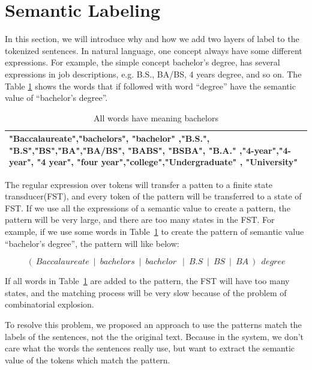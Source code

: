 \section{Semantic Labeling}

In this section, we will introduce why and how we add two layers of label to the tokenized sentences. In natural language, one concept always have some different expressions. For example, the simple concept bachelor's degree,  has several expressions in job descriptions, e.g. B.S., BA/BS, 4 years degree, and so on. The Table \ref{tab:multispelling} shows the words that if followed with word ``degree'' have the semantic value of ``bachelor's degree''.

\begin{table}[ht]
\caption{All words have meaning bachelors } %
\centering %
\begin{tabular}{  | p{15cm} |  }
 \hline
 "Baccalaureate","bachelors", "bachelor" ,"B.S.", "B.S","BS","BA","BA/BS", "BABS", "BSBA", "B.A." ,"4-year","4-year", "4 year", "four year","college","Undergraduate" , "University" \\
  \hline
\end{tabular}
\label{tab:multispelling} %
\end{table}

The regular expression over tokens will transfer a patten to a finite state transducer(FST), and every token of the pattern will be transferred to a state of FST. If we use all the expressions of a semantic value to create a pattern, the pattern will be very large, and there are too many states in the FST. For example, if we use some words in Table~\ref{tab:multispelling} to create the pattern of semantic value ``bachelor's degree'', the pattern will like below:

$$ (~Baccalaureate~\mid~bachelors~\mid~bachelor~~\mid~B.S~\mid~BS~\mid~BA~)~~degree $$

If all words in Table~\ref{tab:multispelling} are added to the pattern, the FST will have too many states, and the matching process will be very slow because of the problem of combinatorial explosion.

To resolve this problem, we proposed an approach to use the patterns match the labels of the sentences, not the the original text. Because in the system, we don't care what the words the sentences really use, but want to extract the semantic value of the tokens which match the pattern.

